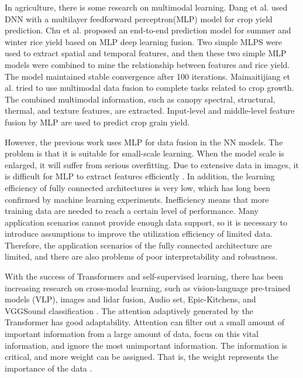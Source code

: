 \documentclass[acmsmall, screen]{acmart}
\begin{document}
 In agriculture, there is some research on multimodal learning. Dang et al. \cite{dang2021autumn} used DNN with a multilayer feedforward perceptron(MLP) model for crop yield prediction. Chu et al. \cite{chu_end--end_2020} proposed an end-to-end prediction model for summer and winter rice yield based on MLP deep learning fusion. Two simple MLPS were used to extract spatial and temporal features, and then these two simple MLP models were combined to mine the relationship between features and rice yield. The model maintained stable convergence after 100 iterations. Maimaitijiang et al. \cite{maimaitijiang_soybean_2020} tried to use multimodal data fusion to complete tasks related to crop growth. The combined multimodal information, such as canopy spectral, structural, thermal, and texture features, are extracted. Input-level and middle-level feature fusion by MLP are used to predict crop grain yield.

However, the previous work uses MLP for data fusion in the NN models. The problem is that it is suitable for small-scale learning. When the model scale is enlarged, it will suffer from serious overfitting. Due to extensive data in images, it is difficult for MLP to extract features efficiently \cite{zhao_battle_2021}. In addition, the learning efficiency of fully connected architectures is very low, which has long been confirmed by machine learning experiments. Inefficiency means that more training data are needed to reach a certain level of performance. Many application scenarios cannot provide enough data support, so it is necessary to introduce assumptions to improve the utilization efficiency of limited data. Therefore, the application scenarios of the fully connected architecture are limited, and there are also problems of poor interpretability and robustness.

With the success of Transformers and self-supervised learning, there has been increasing research on cross-modal learning, such as vision-language pre-trained models (VLP)\cite{clevers_remote_2013}, images and lidar fusion\cite{prakash_multi-modal_2021}, Audio set, Epic-Kitchens, and VGGSound classification \cite{nagrani_attention_nodate}. The attention adaptively generated by the Transformer has good adaptability. Attention can filter out a small amount of important information from a large amount of data, focus on this vital information, and ignore the most unimportant information. The information is critical, and more weight can be assigned. That is, the weight represents the importance of the data \cite{vaswani_attention_2017}.
\end{document}
